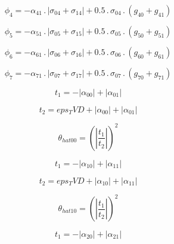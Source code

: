 \documentclass{article}
\begin{document}
\begin{dmath}\phi_{4} = - \alpha_{41} \,.\, \left|{\sigma_{0 4} + \sigma_{1 4}}\right| + 0.5 \,.\, \sigma_{0 4} \,.\, \left(g_{40} + g_{41}\right)\end{dmath}

\begin{dmath}\phi_{5} = - \alpha_{51} \,.\, \left|{\sigma_{0 5} + \sigma_{1 5}}\right| + 0.5 \,.\, \sigma_{0 5} \,.\, \left(g_{50} + g_{51}\right)\end{dmath}

\begin{dmath}\phi_{6} = - \alpha_{61} \,.\, \left|{\sigma_{0 6} + \sigma_{1 6}}\right| + 0.5 \,.\, \sigma_{0 6} \,.\, \left(g_{60} + g_{61}\right)\end{dmath}

\begin{dmath}\phi_{7} = - \alpha_{71} \,.\, \left|{\sigma_{0 7} + \sigma_{1 7}}\right| + 0.5 \,.\, \sigma_{0 7} \,.\, \left(g_{70} + g_{71}\right)\end{dmath}

\begin{dmath}t_{1} = - \left|{\alpha_{00}}\right| + \left|{\alpha_{01}}\right|\end{dmath}

\begin{dmath}t_{2} = eps_TVD + \left|{\alpha_{00}}\right| + \left|{\alpha_{01}}\right|\end{dmath}

\begin{dmath}\theta_{hat 00} = \left(\left|{\frac{t_{1}}{t_{2}}}\right| \right)^{2}\end{dmath}

\begin{dmath}t_{1} = - \left|{\alpha_{10}}\right| + \left|{\alpha_{11}}\right|\end{dmath}

\begin{dmath}t_{2} = eps_TVD + \left|{\alpha_{10}}\right| + \left|{\alpha_{11}}\right|\end{dmath}

\begin{dmath}\theta_{hat 10} = \left(\left|{\frac{t_{1}}{t_{2}}}\right| \right)^{2}\end{dmath}

\begin{dmath}t_{1} = - \left|{\alpha_{20}}\right| + \left|{\alpha_{21}}\right|\end{dmath}
\end{document}
